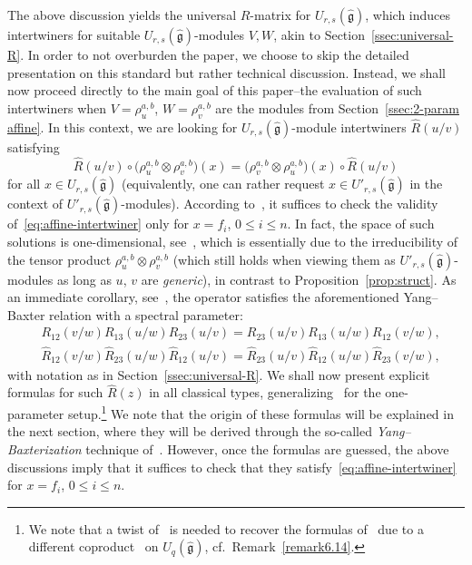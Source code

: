 \documentclass[10pt,a4paper]{amsart}
\numberwithin{equation}{section}
\newcommand{\fg}{\mathfrak{g}}
\newcommand{\UU}{U_{r,s}(\widehat{\fg})}
\newcommand{\Uu}{U'_{r,s}(\widehat{\fg})}
\newcommand\iso{ \vphantom{j^{X^2}}\smash{\overset{\sim}{\vphantom{\rule{0pt}{0.20em}}\smash{\longrightarrow}}} }
\begin{document}
The above discussion yields the universal $R$-matrix for $\UU$, which induces intertwiners \smash{$V\otimes W\iso W\otimes V$} for suitable $\UU$-modules $V,W$, akin to Section~\ref{ssec:universal-R}. In order to not overburden the paper, we choose to skip the detailed presentation on this standard but rather technical discussion. Instead, we shall now proceed directly to the main goal of this paper--the evaluation of such intertwiners when $V=\rho^{a,b}_u$, $W=\rho^{a,b}_v$ are the modules from Section~\ref{ssec:2-param affine}. In this context, we are looking for $\UU$-module intertwiners $\hat{R}(u/v)$ satisfying
\begin{equation}\label{eq:affine-intertwiner}
 \hat{R}(u/v)\circ \bigl(\rho^{a,b}_u\otimes \rho^{a,b}_v\bigr)(x) =
 \bigl(\rho^{a,b}_v\otimes \rho^{a,b}_u\bigr)(x)\circ \hat{R}(u/v)
\end{equation}
for all $x\in \UU$ (equivalently, one can rather request $x\in \Uu$ in the context of $\Uu$-modules). According to~\cite[Proposition~2]{Jim}, it suffices to check the validity of~\eqref{eq:affine-intertwiner} only for $x=f_i$, $0\leq i\leq n$. In fact, the space of such solutions is one-dimensional, see~\cite[Proposition~1]{Jim}, which is essentially due to the irreducibility of the tensor product $\rho^{a,b}_u\otimes \rho^{a,b}_v$ (which still holds when viewing them as $\Uu$-modules as long as $u$, $v$ are \emph{generic}), in contrast to Proposition~\ref{prop:struct}. As an immediate corollary, see~\cite[Proposition~3]{Jim}, the operator  satisfies the aforementioned Yang--Baxter relation with a spectral parameter:
\begin{align}
 & R_{12}(v/w) R_{13}(u/w) R_{23}(u/v) = R_{23}(u/v) R_{13}(u/w) R_{12}(v/w),\nonumber \\
 & \hat{R}_{12}(v/w) \hat{R}_{23}(u/w) \hat{R}_{12}(u/v) =
 \hat{R}_{23}(u/v) \hat{R}_{12}(u/w) \hat{R}_{23}(v/w),\label{eq:qYB-affine}
\end{align}
with notation as in Section~\ref{ssec:universal-R}. We shall now present explicit formulas for such $\hat{R}(z)$ in all classical types, generalizing~\cite{Jim} for the one-parameter setup.\footnote{We note that a twist of~\cite{R} is needed to recover the formulas of~\cite[Section~3]{Jim} due to a different coproduct~\cite[equation~(2.10)]{Jim} on $U_q(\widehat{\fg})$, cf.~Remark~\ref{remark6.14}.} We note that the origin of these formulas will be explained in the next section, where they will be derived through the so-called \emph{Yang--Baxterization} technique of~\cite{GWX}. However, once the formulas are guessed, the above discussions imply that it suffices to check that they satisfy~\eqref{eq:affine-intertwiner} for $x=f_i$, $0\leq i\leq n$.
\end{document}
